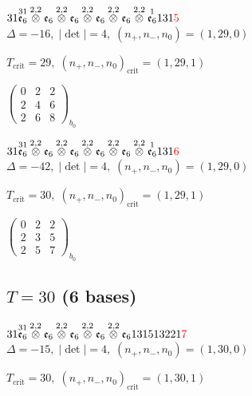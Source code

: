 \documentclass[10pt]{article}
\begin{document}
$31\overset{31}{\mathfrak{e}_6}\overset{2,2}{\otimes}\mathfrak{e}_6\overset{2,2}{\otimes}\mathfrak{e}_6\overset{2,2}{\otimes}\mathfrak{e}_6\overset{2,2}{\otimes}\mathfrak{e}_6\overset{2,2}{\otimes}\overset{1}{\mathfrak{e}_6}131\textcolor{red}{5}$ \quad $\Delta=-16,\; |\det|=4,\; (n_+,n_-,n_0)=(1,29,0)$

\hspace{1em}$T_{\text{crit}}=29,\; (n_+,n_-,n_0)_{\text{crit}}=(1,29,1)$

\hspace{2em}$\left(\begin{smallmatrix}0 & 2 & 2 \\ 2 & 4 & 6 \\ 2 & 6 & 8\end{smallmatrix}\right)_{\!b_0}$

$31\overset{31}{\mathfrak{e}_6}\overset{2,2}{\otimes}\mathfrak{e}_6\overset{2,2}{\otimes}\mathfrak{e}_6\overset{2,2}{\otimes}\mathfrak{e}_6\overset{2,2}{\otimes}\mathfrak{e}_6\overset{2,2}{\otimes}\overset{1}{\mathfrak{e}_6}131\textcolor{red}{6}$ \quad $\Delta=-42,\; |\det|=4,\; (n_+,n_-,n_0)=(1,29,0)$

\hspace{1em}$T_{\text{crit}}=30,\; (n_+,n_-,n_0)_{\text{crit}}=(1,29,1)$

\hspace{2em}$\left(\begin{smallmatrix}0 & 2 & 2 \\ 2 & 3 & 5 \\ 2 & 5 & 7\end{smallmatrix}\right)_{\!b_0}$


\subsection*{$T = 30$ \quad (6 bases)}
\smallskip

$31\overset{31}{\mathfrak{e}_6}\overset{2,2}{\otimes}\mathfrak{e}_6\overset{2,2}{\otimes}\mathfrak{e}_6\overset{2,2}{\otimes}\mathfrak{e}_6\overset{2,2}{\otimes}\mathfrak{e}_6131513221\textcolor{red}{7}$ \quad $\Delta=-15,\; |\det|=4,\; (n_+,n_-,n_0)=(1,30,0)$

\hspace{1em}$T_{\text{crit}}=30,\; (n_+,n_-,n_0)_{\text{crit}}=(1,30,1)$
\end{document}
